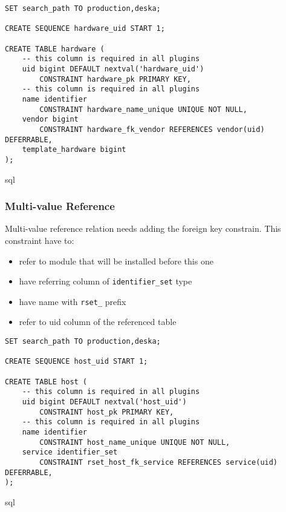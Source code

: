 \documentclass[deska]{subfiles}
\begin{document}
\begin{verbatim}
SET search_path TO production,deska;

CREATE SEQUENCE hardware_uid START 1;

CREATE TABLE hardware (
    -- this column is required in all plugins
    uid bigint DEFAULT nextval('hardware_uid')
        CONSTRAINT hardware_pk PRIMARY KEY,
    -- this column is required in all plugins
    name identifier
        CONSTRAINT hardware_name_unique UNIQUE NOT NULL,
    vendor bigint 
        CONSTRAINT hardware_fk_vendor REFERENCES vendor(uid) DEFERRABLE,
    template_hardware bigint
);
\end{verbatim}{sql}


\subsubsection{Multi-value Reference}
Multi-value reference relation needs adding the foreign key constrain. This constraint have to:
\begin{itemize}
    \item refer to module that will be installed before this one
    \item have referring column of {\tt identifier\_set} type
    \item have name with {\tt rset\_} prefix
    \item refer to uid column of the referenced table
\end{itemize}

\begin{verbatim}
SET search_path TO production,deska;

CREATE SEQUENCE host_uid START 1;

CREATE TABLE host (
    -- this column is required in all plugins
    uid bigint DEFAULT nextval('host_uid')
        CONSTRAINT host_pk PRIMARY KEY,
    -- this column is required in all plugins
    name identifier
        CONSTRAINT host_name_unique UNIQUE NOT NULL,
    service identifier_set
        CONSTRAINT rset_host_fk_service REFERENCES service(uid) DEFERRABLE,
);
\end{verbatim}{sql}
\end{document}
